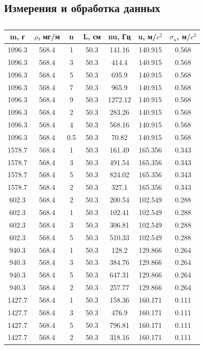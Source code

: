\documentclass[a4paper,12pt]{article} %
\begin{document}
\subsection{Измерения и обработка данных}

\begin{table} \label{} \caption{} \begin{tabular}{|c|c|c|c|c|c|c|} \hline m, г & $\rho$, мг/м & n & L, см & nu, Гц & u, м/$c^2$ & $\sigma_u$, м/$c^2$ \\ \hline 1096.3 & 568.4 & 1 & 50.3 & 141.16 & 140.915 & 0.568 \\ \hline 1096.3 & 568.4 & 3 & 50.3 & 414.4 & 140.915 & 0.568 \\ \hline 1096.3 & 568.4 & 5 & 50.3 & 695.9 & 140.915 & 0.568 \\ \hline 1096.3 & 568.4 & 7 & 50.3 & 965.9 & 140.915 & 0.568 \\ \hline 1096.3 & 568.4 & 9 & 50.3 & 1272.12 & 140.915 & 0.568 \\ \hline 1096.3 & 568.4 & 2 & 50.3 & 283.26 & 140.915 & 0.568 \\ \hline 1096.3 & 568.4 & 4 & 50.3 & 568.16 & 140.915 & 0.568 \\ \hline 1096.3 & 568.4 & 0.5 & 50.3 & 70.82 & 140.915 & 0.568 \\ \hline 1578.7 & 568.4 & 1 & 50.3 & 161.49 & 165.356 & 0.343 \\ \hline 1578.7 & 568.4 & 3 & 50.3 & 491.54 & 165.356 & 0.343 \\ \hline 1578.7 & 568.4 & 5 & 50.3 & 824.02 & 165.356 & 0.343 \\ \hline 1578.7 & 568.4 & 2 & 50.3 & 327.1 & 165.356 & 0.343 \\ \hline 602.3 & 568.4 & 2 & 50.3 & 200.54 & 102.549 & 0.288 \\ \hline 602.3 & 568.4 & 1 & 50.3 & 102.41 & 102.549 & 0.288 \\ \hline 602.3 & 568.4 & 3 & 50.3 & 306.81 & 102.549 & 0.288 \\ \hline 602.3 & 568.4 & 5 & 50.3 & 510.33 & 102.549 & 0.288 \\ \hline 940.3 & 568.4 & 1 & 50.3 & 128.2 & 129.866 & 0.264 \\ \hline 940.3 & 568.4 & 3 & 50.3 & 384.76 & 129.866 & 0.264 \\ \hline 940.3 & 568.4 & 5 & 50.3 & 647.31 & 129.866 & 0.264 \\ \hline 940.3 & 568.4 & 2 & 50.3 & 257.77 & 129.866 & 0.264 \\ \hline 1427.7 & 568.4 & 1 & 50.3 & 158.36 & 160.171 & 0.111 \\ \hline 1427.7 & 568.4 & 3 & 50.3 & 476.9 & 160.171 & 0.111 \\ \hline 1427.7 & 568.4 & 5 & 50.3 & 796.81 & 160.171 & 0.111 \\ \hline 1427.7 & 568.4 & 2 & 50.3 & 318.16 & 160.171 & 0.111 \\ \hline \end{tabular} \end{table}
\end{document}
